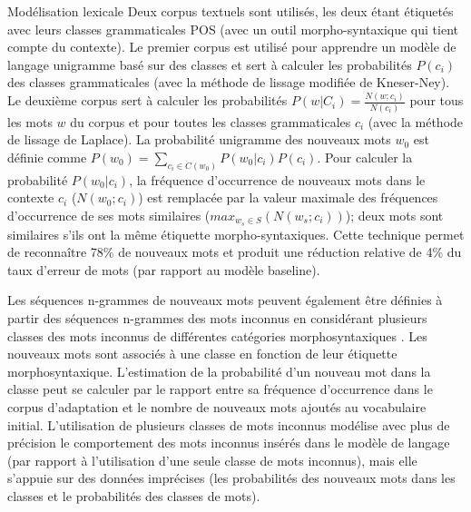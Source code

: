 \documentclass{style/these}
\let\oldcite=\cite
\renewcommand{\cite}[1]{{\fontfamily{qcs}\selectfont{\color{darkerblue}[\oldcite{#1}]}}}
\begin{document}
\begin{part}{Modélisation lexicale}
Deux corpus textuels sont utilisés, les deux étant étiquetés avec leurs classes grammaticales \acrshort{POS} (avec un outil morpho-syntaxique qui tient compte du contexte). 
Le premier corpus est utilisé pour apprendre un modèle de langage unigramme basé sur des classes et sert à calculer les probabilités $P(c_i)$ des classes grammaticales (avec la méthode de lissage modifiée de Kneser-Ney). 
Le deuxième corpus sert à calculer les probabilités $P(w|C_i)=\frac{N(w; c_i)}{N(c_i)}$ pour tous les mots $w$ du corpus et pour toutes les classes grammaticales $c_i$ (avec la méthode de lissage de Laplace). 
La probabilité unigramme des nouveaux mots $w_0$ est définie comme $P(w_0)=\sum_{c_i \in C(w_0)}P(w_0|c_i)P(c_i)$. 
Pour calculer la probabilité $P(w_0|c_i)$, la fréquence d'occurrence de nouveaux mots dans le contexte $c_i$ ($N(w_0;c_i)$) est remplacée par la valeur maximale des fréquences d'occurrence de ses mots similaires ($max_{w_s \in S} (N(w_s; c_i))$); deux mots sont similaires s'ils ont la même étiquette morpho-syntaxiques. 
Cette technique permet de reconnaître 78\% de nouveaux mots et produit une réduction relative de 4\% du taux d'erreur de mots (par rapport au modèle baseline). 


Les séquences n-grammes de nouveaux mots peuvent également être définies à partir des séquences n-grammes des mots inconnus en considérant plusieurs classes des mots inconnus de différentes catégories morphosyntaxiques \cite{Oger:2011}. Les nouveaux mots sont associés à une classe en fonction de leur étiquette morphosyntaxique. L'estimation de la probabilité d'un nouveau mot dans la classe peut se calculer par le rapport entre sa fréquence d'occurrence dans le corpus d'adaptation et le nombre de nouveaux mots ajoutés au vocabulaire initial. L'utilisation de plusieurs classes de mots inconnus modélise avec plus de précision le comportement des mots inconnus insérés dans le modèle de langage (par rapport à l'utilisation d'une seule classe de mots inconnus), mais elle s'appuie sur des données imprécises (les probabilités des nouveaux mots dans les classes et le probabilités des classes de mots).


\end{part}
\end{document}
